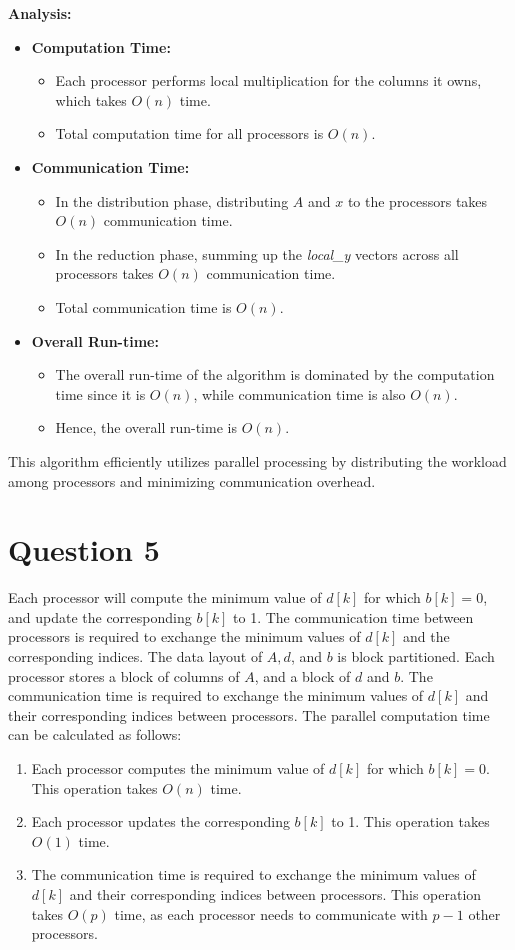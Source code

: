 \documentclass{article}
\begin{document}
\textbf{Analysis:}
\begin{itemize}
    \item \textbf{Computation Time:}
    \begin{itemize}
        \item Each processor performs local multiplication for the columns it owns, which takes $O(n)$ time.
        \item Total computation time for all processors is $O(n)$.
    \end{itemize}
    \item \textbf{Communication Time:}
    \begin{itemize}
        \item In the distribution phase, distributing $A$ and $x$ to the processors takes $O(n)$ communication time.
        \item In the reduction phase, summing up the \textit{local\_y} vectors across all processors takes $O(n)$ communication time.
        \item Total communication time is $O(n)$.
    \end{itemize}
    \item \textbf{Overall Run-time:}
    \begin{itemize}
        \item The overall run-time of the algorithm is dominated by the computation time since it is $O(n)$, while communication time is also $O(n)$.
        \item Hence, the overall run-time is $O(n)$.
    \end{itemize}
\end{itemize}

This algorithm efficiently utilizes parallel processing by distributing the workload among processors and minimizing communication overhead.
\section{Question 5}
Each processor will compute the minimum value of $d[k]$ for which $b[k]=0$, and update the corresponding $b[k]$ to 1.
The communication time between processors is required to exchange the minimum values of $d[k]$ and the corresponding indices.
The data layout of $A, d$, and $b$ is block partitioned.
Each processor stores a block of columns of $A$, and a block of $d$ and $b$.
The communication time is required to exchange the minimum values of $d[k]$ and their corresponding indices between processors.
The parallel computation time can be calculated as follows:
\begin{enumerate}
  \item Each processor computes the minimum value of $d[k]$ for which $b[k]=0$. This operation takes $O(n)$ time.
  \item Each processor updates the corresponding $b[k]$ to 1. This operation takes $O(1)$ time.
  \item The communication time is required to exchange the minimum values of $d[k]$ and their corresponding indices between processors. This operation takes $O(p)$ time, as each processor needs to communicate with $p-1$ other processors.
\end{enumerate}
\end{document}
